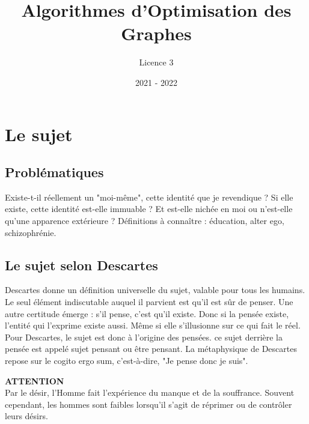 \documentclass{article}%
\title{Algorithmes d'Optimisation des Graphes}%
\author{Licence 3}%
\date{2021 {-} 2022}%
\begin{document}
%
\normalsize%
\sffamily
\maketitle%
\tableofcontents%
\newpage%
\section{Le sujet}%
\label{sec:Lesujet}%

%
\subsection{Problématiques}%
\label{subsec:Problmatiques}%
Existe{-}t{-}il réellement un "moi{-}même", cette identité que je revendique ?%
\newline%
\newline%
Si elle existe, cette identité est{-}elle immuable ?%
\newline%
\newline%
Et est{-}elle nichée en moi ou n'est{-}elle qu'une apparence extérieure ?%
\newline%
\newline%
Définitions à connaître : éducation, alter ego, schizophrénie.

%
\subsection{Le sujet selon Descartes}%
\label{subsec:LesujetselonDescartes}%
Descartes donne un définition universelle du sujet, valable pour tous les humains. Le seul élément indiscutable auquel il parvient est qu'il est sûr de penser. Une autre certitude émerge : s'il pense, c'est qu'il existe. Donc si la pensée existe, l'entité qui l'exprime existe aussi. Même si elle s'illusionne sur ce qui fait le réel. Pour Descartes, le sujet est donc à l'origine des pensées. ce sujet derrière la pensée est appelé sujet pensant ou être pensant. La métaphysique de Descartes repose sur le cogito ergo sum, c'est{-}à{-}dire, "Je pense donc je suis".

\begin{solution}
{ \scriptsize \textcolor{danger}{ \textbf{ATTENTION}}}
\vspace{3px}
\\ Par le désir, l'Homme fait l'expérience du manque et de la souffrance. Souvent cependant, les hommes sont faibles lorsqu'il s'agit de réprimer ou de contrôler leurs désirs.
\end{solution}
\end{document}
